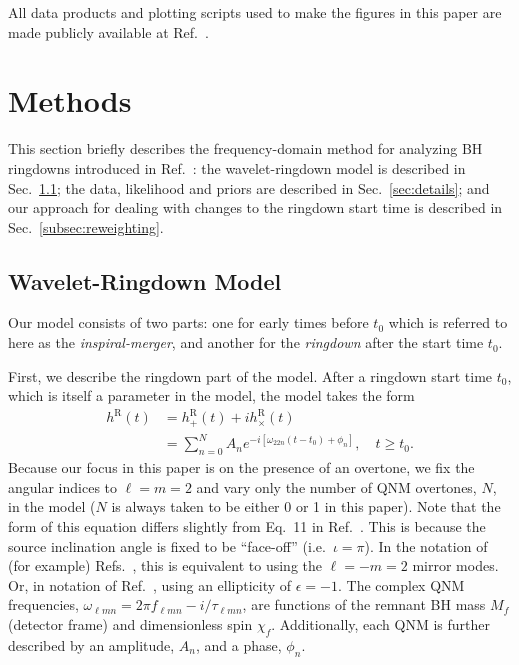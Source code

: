 All data products and plotting scripts used to make the figures in this paper are made publicly available at Ref.~\cite{finch_eliot_2022_6949492}.


\section{Methods}\label{sec:analysis}

This section briefly describes the frequency-domain method for analyzing BH ringdowns introduced in Ref.~\cite{Finch:2021qph}:
the wavelet-ringdown model is described in Sec.~\ref{sec:model}; the data, likelihood and priors are described in Sec.~\ref{sec:details}; and our approach for dealing with changes to the ringdown start time is described in Sec.~\ref{subsec:reweighting}.


\subsection{Wavelet-Ringdown Model}\label{sec:model}

Our model consists of two parts: one for early times before $t_0$ which is referred to here as the \emph{inspiral-merger}, and another for the \emph{ringdown} after the start time $t_0$.

First, we describe the ringdown part of the model.
After a ringdown start time $t_0$, which is itself a parameter in the model, the model takes the form
\begin{align}
	h^\mathrm{R}(t) &= h_+^\mathrm{R}(t) + ih_\times^\mathrm{R}(t) \nonumber \\
	&= \sum_{n=0}^N A_n e^{-i[\omega_{22n}(t-t_0) + \phi_{n}]}, \quad t \geq t_0. \label{eq:ringdown_model}
\end{align}
Because our focus in this paper is on the presence of an overtone, we fix the angular indices to $\ell = m = 2$ and vary only the number of QNM overtones, $N$, in the model ($N$ is always taken to be either 0 or 1 in this paper). 
Note that the form of this equation differs slightly from Eq.~11 in Ref.~\cite{Finch:2021qph}. This is because the source inclination angle is fixed to be ``face-off'' (i.e.\ $\iota=\pi$).
In the notation of (for example) Refs.~\cite{Dhani:2020nik, Finch:2021iip, MaganaZertuche:2021syq}, this is equivalent to using the $\ell = -m = 2$ mirror modes. 
Or, in notation of Ref.~\cite{Isi:2021iql}, using an ellipticity of $\epsilon = -1$.
The complex QNM frequencies, $\omega_{\ell m n} = 2\pi f_{\ell m n} - i/\tau_{\ell m n}$, are functions of the remnant BH mass $M_f$ (detector frame) and dimensionless spin $\chi_f$.
Additionally, each QNM is further described by an amplitude, $A_{n}$, and a phase, $\phi_{n}$. 

